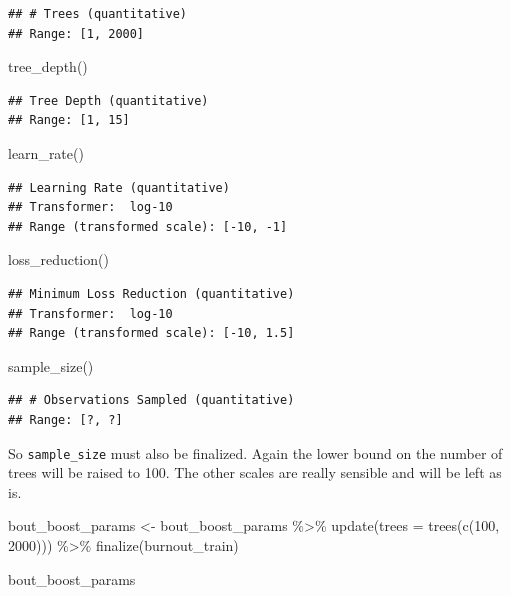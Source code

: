 \documentclass[
]{book}
\newenvironment{Shaded}{\begin{snugshade}}{\end{snugshade}}
\newcommand{\AttributeTok}[1]{\textcolor[rgb]{0.77,0.63,0.00}{#1}}
\newcommand{\DecValTok}[1]{\textcolor[rgb]{0.00,0.00,0.81}{#1}}
\newcommand{\FunctionTok}[1]{\textcolor[rgb]{0.00,0.00,0.00}{#1}}
\newcommand{\NormalTok}[1]{#1}
\newcommand{\OtherTok}[1]{\textcolor[rgb]{0.56,0.35,0.01}{#1}}
\newcommand{\SpecialCharTok}[1]{\textcolor[rgb]{0.00,0.00,0.00}{#1}}
\begin{document}
\begin{verbatim}
## # Trees (quantitative)
## Range: [1, 2000]
\end{verbatim}

\begin{Shaded}
\begin{Highlighting}[]
\FunctionTok{tree\_depth}\NormalTok{()}
\end{Highlighting}
\end{Shaded}

\begin{verbatim}
## Tree Depth (quantitative)
## Range: [1, 15]
\end{verbatim}

\begin{Shaded}
\begin{Highlighting}[]
\FunctionTok{learn\_rate}\NormalTok{()}
\end{Highlighting}
\end{Shaded}

\begin{verbatim}
## Learning Rate (quantitative)
## Transformer:  log-10 
## Range (transformed scale): [-10, -1]
\end{verbatim}

\begin{Shaded}
\begin{Highlighting}[]
\FunctionTok{loss\_reduction}\NormalTok{()}
\end{Highlighting}
\end{Shaded}

\begin{verbatim}
## Minimum Loss Reduction (quantitative)
## Transformer:  log-10 
## Range (transformed scale): [-10, 1.5]
\end{verbatim}

\begin{Shaded}
\begin{Highlighting}[]
\FunctionTok{sample\_size}\NormalTok{()}
\end{Highlighting}
\end{Shaded}

\begin{verbatim}
## # Observations Sampled (quantitative)
## Range: [?, ?]
\end{verbatim}

So \texttt{sample\_size} must also be finalized. Again the lower bound on the number of trees will be raised to 100. The other scales are really sensible and will be left as is.

\begin{Shaded}
\begin{Highlighting}[]
\NormalTok{bout\_boost\_params }\OtherTok{\textless{}{-}}\NormalTok{ bout\_boost\_params }\SpecialCharTok{\%\textgreater{}\%}
  \FunctionTok{update}\NormalTok{(}\AttributeTok{trees =} \FunctionTok{trees}\NormalTok{(}\FunctionTok{c}\NormalTok{(}\DecValTok{100}\NormalTok{, }\DecValTok{2000}\NormalTok{))) }\SpecialCharTok{\%\textgreater{}\%}
  \FunctionTok{finalize}\NormalTok{(burnout\_train)}

\NormalTok{bout\_boost\_params}
\end{Highlighting}
\end{Shaded}
\end{document}
